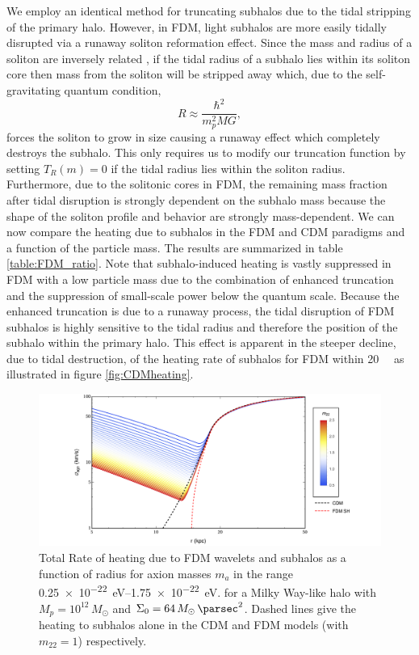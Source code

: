 \documentclass[usenatbib]{mnras}
\begin{document}
We employ an identical method for truncating subhalos due to the tidal stripping of the primary halo. However, in FDM, light subhalos are more easily tidally disrupted via a runaway soliton reformation effect. Since the mass and radius of a soliton are inversely related \citep{solitons}, if the tidal radius of a subhalo lies within its soliton core then mass from the soliton will be stripped away which, due to the self-gravitating quantum condition,
\begin{equation}
R \approx \frac{\hbar^2}{m_p^2 M G},
\end{equation} 
forces the soliton to grow in size causing a runaway effect which completely destroys the subhalo. This only requires us to modify our truncation function by setting $T_R(m) = 0$ if the tidal radius lies within the soliton radius. Furthermore, due to the solitonic cores in FDM, the remaining mass fraction after tidal disruption is strongly dependent on the subhalo mass because the shape of the soliton profile and behavior are strongly mass-dependent. We can now compare the heating due to subhalos in the FDM and CDM paradigms and a function of the particle mass. The results are summarized in table \ref{table:FDM_ratio}. Note that subhalo-induced heating is vastly suppressed in FDM with a low particle mass due to the combination of enhanced truncation and the suppression of small-scale power below the quantum scale. Because the enhanced truncation is due to a runaway process, the tidal disruption of FDM subhalos is highly sensitive to the tidal radius and therefore the position of the subhalo within the primary halo.
This effect is apparent in the steeper decline,  due to tidal destruction, of the heating rate of subhalos for FDM within \SI{20}{\kilo\parsec} as illustrated in figure \ref{fig:CDMheating}.
 
\begin{figure}
\includegraphics[width=17cm]{FDM_velocity}
\caption{Total Rate of heating due to FDM wavelets and subhalos as a function of radius for axion masses $m_{a}$ in the range \SIrange{0.25 e-22}{ 1.75 e-22}{\electronvolt}. for a Milky Way-like halo with $M_p = 10^{12} \, M_\odot$ and $\Sigma_0 = 64 \, M_\odot \, \si{\per\parsec^2}$. Dashed lines give the heating to subhalos alone in the CDM and FDM models (with $m_{22} = 1$) respectively.}
\label{fig:radiusheating}
\end{figure}
\end{document}
